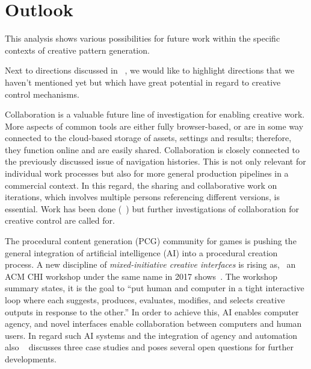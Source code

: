 
\section{Outlook}
\label{sec:outlook}

This analysis shows various possibilities for future work within the specific contexts of creative pattern generation. 


%


Next to directions discussed in ~, we would like to highlight directions that we haven't mentioned yet but which have great potential in regard to creative control mechanisms.

Collaboration is a valuable future line of investigation for enabling creative work. More aspects of common tools are either fully browser-based, or are in some way connected to the cloud-based storage of assets, settings and results; therefore, they function online and are easily shared. Collaboration is closely connected to the previously discussed issue of navigation histories. This is not only relevant for individual work processes but also for more general production pipelines in a commercial context. In this regard, the sharing and collaborative work on iterations, which involves multiple persons referencing different versions, is essential. Work has been done (\eg~\cite{talton_2009_emw, salvati_2015_mcm,oleary_2018_csi}) but further investigations of collaboration for creative control are called for. 

The procedural content generation (PCG) community for games is pushing the general integration of artificial intelligence (AI) into a procedural creation process. A new discipline of \textit{mixed-initiative creative interfaces} is rising as, \eg~an ACM CHI workshop under the same name in 2017 shows~\cite{deterding_2017_mci}. The workshop summary states, it is the goal to ``put human and computer in a tight interactive loop where each suggests, produces, evaluates, modifies, and selects creative outputs in response to the other.'' In order to achieve this, AI enables computer agency, and novel interfaces enable collaboration between computers and human users. In regard such AI systems and the integration of agency and automation also \citeauthor*{heer_2019_apa}~\cite{heer_2019_apa} discusses three case studies and poses several open questions for further developments.

